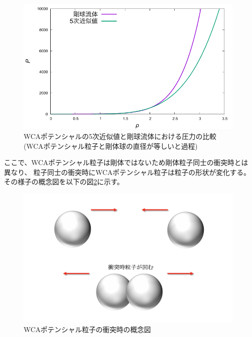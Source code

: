 \documentclass[titlepage]{jsreport}
\begin{document}
{{{\begin{figure}[htbp]
    \begin{center}
        \includegraphics[width=14cm]{fig/compare_previous-research.pdf}
    \end{center}
    \caption{WCAポテンシャルの5次近似値と剛球流体における圧力の比較(WCAポテンシャル粒子と剛体球の直径が等しいと過程)}
    \label{fig:compare_previous-research}
\end{figure}

ここで、WCAポテンシャル粒子は剛体ではないため剛体粒子同士の衝突時とは異なり、
粒子同士の衝突時にWCAポテンシャル粒子は粒子の形状が変化する。
その様子の概念図を以下の図\ref{fig:WCA-collision}に示す。

\begin{figure}[htbp]
    \begin{center}
        \includegraphics[width=11.5cm]{fig/WCA-collision.png}
    \end{center}
    \caption{WCAポテンシャル粒子の衝突時の概念図}
    \label{fig:WCA-collision}
\end{figure}

}}}
\end{document}
